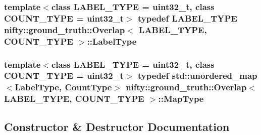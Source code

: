 \subsubsection[{Label\+Type}]{\setlength{\rightskip}{0pt plus 5cm}template$<$class L\+A\+B\+E\+L\+\_\+\+T\+Y\+P\+E  = uint32\+\_\+t, class C\+O\+U\+N\+T\+\_\+\+T\+Y\+P\+E  = uint32\+\_\+t$>$ typedef L\+A\+B\+E\+L\+\_\+\+T\+Y\+P\+E {\bf nifty\+::ground\+\_\+truth\+::\+Overlap}$<$ L\+A\+B\+E\+L\+\_\+\+T\+Y\+P\+E, C\+O\+U\+N\+T\+\_\+\+T\+Y\+P\+E $>$\+::{\bf Label\+Type}}\label{classnifty_1_1ground__truth_1_1Overlap_af14b9a872d3736d3115231866bc71612}
\hypertarget{classnifty_1_1ground__truth_1_1Overlap_a6866ee8c988dd21d3fbd6ee5c2e836bf}{}
\subsubsection[{Map\+Type}]{\setlength{\rightskip}{0pt plus 5cm}template$<$class L\+A\+B\+E\+L\+\_\+\+T\+Y\+P\+E  = uint32\+\_\+t, class C\+O\+U\+N\+T\+\_\+\+T\+Y\+P\+E  = uint32\+\_\+t$>$ typedef std\+::unordered\+\_\+map$<${\bf Label\+Type}, {\bf Count\+Type}$>$ {\bf nifty\+::ground\+\_\+truth\+::\+Overlap}$<$ L\+A\+B\+E\+L\+\_\+\+T\+Y\+P\+E, C\+O\+U\+N\+T\+\_\+\+T\+Y\+P\+E $>$\+::{\bf Map\+Type}}\label{classnifty_1_1ground__truth_1_1Overlap_a6866ee8c988dd21d3fbd6ee5c2e836bf}


\subsection{Constructor \& Destructor Documentation}
\hypertarget{classnifty_1_1ground__truth_1_1Overlap_aedaa9af95b736f17f2dbfe0eff4c09bf}{}
